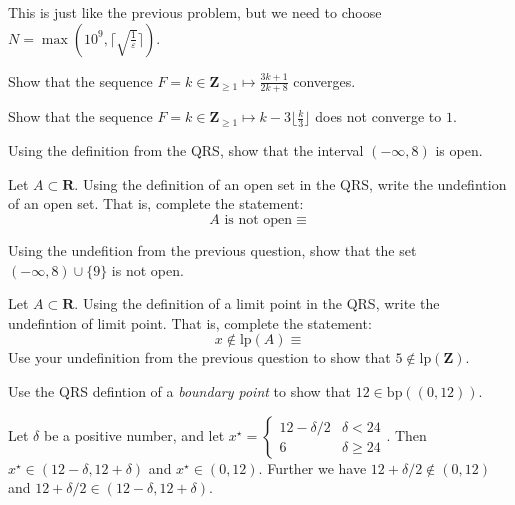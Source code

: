 \documentclass[12pt, fleqn, answers]{exam}
\newcommand{\reals}{\mathbf{R}}
\newcommand{\integers}{\mathbf{Z}}
\newcommand{\bp}{\mathrm{bp}}
\newcommand{\lp}{\mathrm{lp}}
\begin{document}
\begin{questions}
\begin{solution} This is just like the previous problem, but we need to choose $N = \max(10^9,  \lceil \sqrt{\frac{1}{\varepsilon}} \rceil)$.

\end{solution}

\question Show that the sequence $F = k \in \integers_{\geq 1} \mapsto \frac{3 k+ 1}{2 k + 8}$ converges.


\question Show that the sequence $F = k \in \integers_{\geq 1} \mapsto k - 3 \lfloor \frac{k}{3} \rfloor $ does 
not converge to $1$.


\question Using the definition from the QRS, show that the interval $(-\infty, 8)$ is open.

\question Let $A \subset \reals$.  Using the definition of an open set in the QRS, write
the undefintion of an open set. That is, complete the statement:
\begin{equation*}
  A \text{ is not open} \equiv 
\end{equation*}

\question Using the undefition from the previous question, show that the set \mbox{$(-\infty, 8) \cup \{9 \}$} is
not open.

\question Let $A \subset \reals$.  Using the definition of a limit point in the QRS, write
the undefintion of limit point. That is, complete the statement:
\begin{equation*}
  x \not \in \lp(A) \equiv 
\end{equation*}
\question  Use your undefinition from the previous question to show that \(5 \notin  \lp (\integers)\).


\begin{solution}%

\end{solution}

\question  Use the QRS defintion of a \emph{boundary point} to show that $12 \in \bp((0,12))$.


\begin{solution}%
Let \(\delta\) be a positive number, and let \(x^\star = \begin{cases} 12 - \delta/2 & \delta < 24 \\
                                                                      6  & \delta \geq 24 
\end{cases}\). Then \(x^\star \in (12-\delta, 12+ \delta)\) and \(x^\star \in (0,12)\). Further
we have \(12 + \delta /2 \notin (0,12)\) and \(12 + \delta/2 \in (12-\delta, 12+ \delta)\).


\end{solution}
\end{questions}
\end{document}
